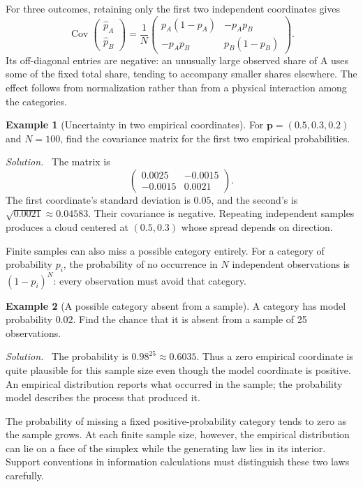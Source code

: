 \documentclass[11pt,oneside,openany]{book}
\theoremstyle{definition}
\newtheorem{example}{Example}[chapter]
\theoremstyle{remark}
\newenvironment{solution}{\par\smallskip\noindent\textit{Solution.}\ }{\par\smallskip}
\newcommand{\p}{\mathbf{p}}
\numberwithin{equation}{chapter}
\begin{document}
For three outcomes, retaining only the first two independent coordinates gives
\[
\operatorname{Cov}\begin{pmatrix}\widehat p_A\\\widehat p_B\end{pmatrix}
=\frac1N\begin{pmatrix}p_A(1-p_A)&-p_Ap_B\\-p_Ap_B&p_B(1-p_B)\end{pmatrix}.
\]
Its off-diagonal entries are negative: an unusually large observed share of A uses some of the fixed total share, tending to accompany smaller shares elsewhere. The effect follows from normalization rather than from a physical interaction among the categories.

\begin{example}[Uncertainty in two empirical coordinates]
For $\p=(0.5,0.3,0.2)$ and $N=100$, find the covariance matrix for the first two empirical probabilities.
\begin{solution}
The matrix is
\[
\begin{pmatrix}0.0025&-0.0015\\-0.0015&0.0021\end{pmatrix}.
\]
The first coordinate's standard deviation is $0.05$, and the second's is $\sqrt{0.0021}\approx0.04583$. Their covariance is negative. Repeating independent samples produces a cloud centered at $(0.5,0.3)$ whose spread depends on direction.
\end{solution}
\end{example}

Finite samples can also miss a possible category entirely. For a category of probability $p_i$, the probability of no occurrence in $N$ independent observations is $(1-p_i)^N$: every observation must avoid that category.

\begin{example}[A possible category absent from a sample]
A category has model probability $0.02$. Find the chance that it is absent from a sample of 25 observations.
\begin{solution}
The probability is $0.98^{25}\approx0.6035$. Thus a zero empirical coordinate is quite plausible for this sample size even though the model coordinate is positive. An empirical distribution reports what occurred in the sample; the probability model describes the process that produced it.
\end{solution}
\end{example}

The probability of missing a fixed positive-probability category tends to zero as the sample grows. At each finite sample size, however, the empirical distribution can lie on a face of the simplex while the generating law lies in its interior. Support conventions in information calculations must distinguish these two laws carefully.
\end{document}
